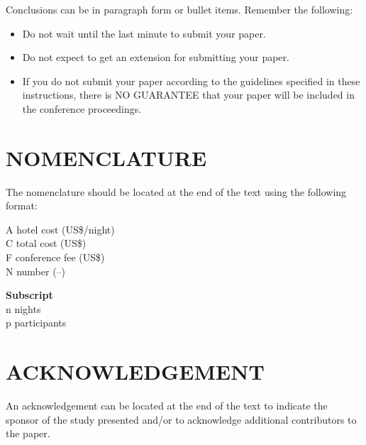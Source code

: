 \documentclass[10pt]{extarticle}
\begin{document}
Conclusions can be in paragraph form or bullet items.  Remember the following:

\begin{itemize}
\itemsep-5pt
\item Do not wait until the last minute to submit your paper. 
\item Do not expect to get an extension for submitting your paper. 
\item If you do not submit your paper according to the guidelines specified in these instructions, there is NO GUARANTEE that your paper will be included in the conference proceedings.
\end{itemize}	

\section*{NOMENCLATURE}

The nomenclature should be located at the end of the text using the following format:\\
\begin{samepage}
A	hotel cost	(US\$/night)	\\
C	total cost	(US\$)	\\
F	conference fee	(US\$)\\	
N	number	(–)\\
\end{samepage}
\begin{samepage}
\textbf{Subscript}\\
n	nights	\\
p   participants	\\
\end{samepage}





\section*{ACKNOWLEDGEMENT}

An acknowledgement can be located at the end of the text to indicate the sponsor of the study presented and/or to acknowledge additional contributors to the paper.
\end{document}
